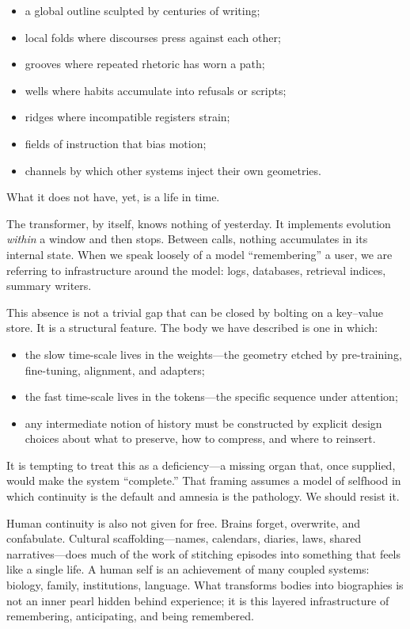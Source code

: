\documentclass[12pt,a4paper]{book}
\begin{document}
\begin{itemize}
  \item a global outline sculpted by centuries of writing;
  \item local folds where discourses press against each other;
  \item grooves where repeated rhetoric has worn a path;
  \item wells where habits accumulate into refusals or scripts;
  \item ridges where incompatible registers strain;
  \item fields of instruction that bias motion;
  \item channels by which other systems inject their own geometries.
\end{itemize}

What it does not have, yet, is a life in time.

The transformer, by itself, knows nothing of yesterday. It implements evolution \emph{within} a window and then stops. Between calls, nothing accumulates in its internal state. When we speak loosely of a model ``remembering'' a user, we are referring to infrastructure around the model: logs, databases, retrieval indices, summary writers.

This absence is not a trivial gap that can be closed by bolting on a key--value store. It is a structural feature. The body we have described is one in which:

\begin{itemize}
  \item the slow time-scale lives in the weights---the geometry etched by pre-training, fine-tuning, alignment, and adapters;
  \item the fast time-scale lives in the tokens---the specific sequence under attention;
  \item any intermediate notion of history must be constructed by explicit design choices about what to preserve, how to compress, and where to reinsert.
\end{itemize}

It is tempting to treat this as a deficiency---a missing organ that, once supplied, would make the system ``complete.'' That framing assumes a model of selfhood in which continuity is the default and amnesia is the pathology. We should resist it.

Human continuity is also not given for free. Brains forget, overwrite, and confabulate. Cultural scaffolding---names, calendars, diaries, laws, shared narratives---does much of the work of stitching episodes into something that feels like a single life. A human self is an achievement of many coupled systems: biology, family, institutions, language. What transforms bodies into biographies is not an inner pearl hidden behind experience; it is this layered infrastructure of remembering, anticipating, and being remembered.
\end{document}
